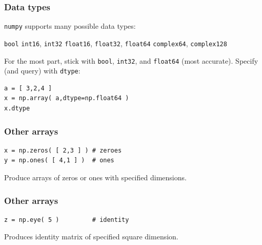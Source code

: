 \documentclass[11pt]{beamer}
\begin{document}
\begin{frame}[fragile]
  \frametitle{Data types}
  \Enlarge

  \begin{enumerate}
  \myitem  \texttt{numpy} supports many possible data types:
    \begin{enumerate}
    \mysubitem  \texttt{bool}
    \mysubitem  \texttt{int16}, \texttt{int32}
    \mysubitem  \texttt{float16}, \texttt{float32}, \texttt{float64}
    \mysubitem  \texttt{complex64}, \texttt{complex128}
    \end{enumerate} %
  \myitem  For the most part, stick with \texttt{bool}, \texttt{int32}, and \texttt{float64} (most accurate).
  \myitem  Specify (and query) with \texttt{dtype}:
  \end{enumerate}
  \begin{Verbatim}
a = [ 3,2,4 ]
x = np.array( a,dtype=np.float64 )
x.dtype
  \end{Verbatim}
\end{frame}

\begin{frame}[fragile]
  \frametitle{Other arrays}
  \Enlarge

  \begin{Verbatim}
x = np.zeros( [ 2,3 ] ) # zeroes
y = np.ones( [ 4,1 ] )  # ones
  \end{Verbatim}
  \begin{enumerate}
  \myitem  Produce arrays of zeros or ones with specified dimensions.
  \end{enumerate}
\end{frame}

\begin{frame}[fragile]
  \frametitle{Other arrays}
  \Enlarge

  \begin{Verbatim}
z = np.eye( 5 )         # identity
  \end{Verbatim}
  \begin{enumerate}
  \myitem  Produces identity matrix of specified square dimension.
  \end{enumerate}
\end{frame}
\end{document}
